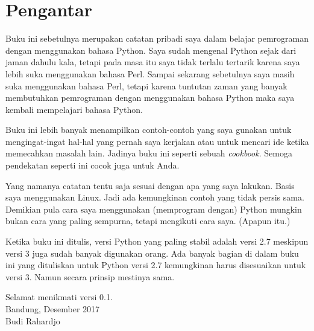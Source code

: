 \chapter*{Pengantar}
Buku ini sebetulnya merupakan catatan pribadi saya dalam belajar pemrograman
dengan menggunakan bahasa Python. Saya sudah mengenal Python sejak dari jaman
dahulu kala, tetapi pada masa itu saya tidak terlalu tertarik karena saya lebih
suka menggunakan bahasa Perl. Sampai sekarang sebetulnya saya masih suka
menggunakan bahasa Perl, tetapi karena tuntutan zaman yang banyak membutuhkan
pemrograman dengan menggunakan bahasa Python maka saya kembali mempelajari
bahasa Python.

Buku ini lebih banyak menampilkan contoh-contoh yang saya gunakan untuk
mengingat-ingat hal-hal yang pernah saya kerjakan atau untuk mencari ide ketika
memecahkan masalah lain. Jadinya buku ini seperti sebuah {\em cookbook}. Semoga
pendekatan seperti ini cocok juga untuk Anda.

Yang namanya catatan tentu saja sesuai dengan apa yang saya lakukan. Basis saya
menggunakan Linux. Jadi ada kemungkinan contoh yang tidak persis sama. Demikian
pula cara saya menggunakan (memprogram dengan) Python mungkin bukan cara yang
paling sempurna, tetapi mengikuti cara saya. (Apapun itu.)

Ketika buku ini ditulis, versi Python yang paling stabil adalah versi 2.7
meskipun versi 3 juga sudah banyak digunakan orang. Ada banyak bagian di dalam
buku ini yang dituliskan untuk Python versi 2.7 kemungkinan harus disesuaikan
untuk versi 3. Namun secara prinsip mestinya sama.

Selamat menikmati versi 0.1.\\
Bandung, Desember 2017\\
Budi Rahardjo
